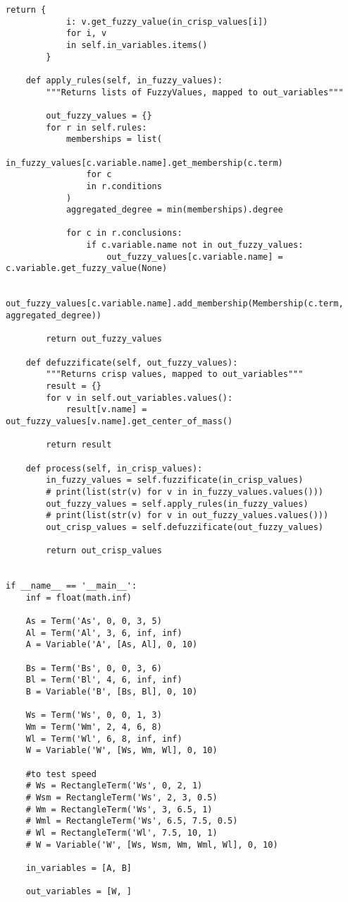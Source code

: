 \begin{lstlisting}[style=pythonstyle,caption={ }, label=lst:func:1]
		return {
			i: v.get_fuzzy_value(in_crisp_values[i])
			for i, v
			in self.in_variables.items()
		}

	def apply_rules(self, in_fuzzy_values):
		"""Returns lists of FuzzyValues, mapped to out_variables"""

		out_fuzzy_values = {}
		for r in self.rules:
			memberships = list(
				in_fuzzy_values[c.variable.name].get_membership(c.term)
				for c
				in r.conditions
			)
			aggregated_degree = min(memberships).degree

			for c in r.conclusions:
				if c.variable.name not in out_fuzzy_values:
					out_fuzzy_values[c.variable.name] = c.variable.get_fuzzy_value(None)

				out_fuzzy_values[c.variable.name].add_membership(Membership(c.term, aggregated_degree))

		return out_fuzzy_values

	def defuzzificate(self, out_fuzzy_values):
		"""Returns crisp values, mapped to out_variables"""
		result = {}
		for v in self.out_variables.values():
			result[v.name] = out_fuzzy_values[v.name].get_center_of_mass()

		return result

	def process(self, in_crisp_values):
		in_fuzzy_values = self.fuzzificate(in_crisp_values)
		# print(list(str(v) for v in in_fuzzy_values.values()))
		out_fuzzy_values = self.apply_rules(in_fuzzy_values)
		# print(list(str(v) for v in out_fuzzy_values.values()))
		out_crisp_values = self.defuzzificate(out_fuzzy_values)

		return out_crisp_values


if __name__ == '__main__':
	inf = float(math.inf)

	As = Term('As', 0, 0, 3, 5)
	Al = Term('Al', 3, 6, inf, inf)
	A = Variable('A', [As, Al], 0, 10)

	Bs = Term('Bs', 0, 0, 3, 6)
	Bl = Term('Bl', 4, 6, inf, inf)
	B = Variable('B', [Bs, Bl], 0, 10)

	Ws = Term('Ws', 0, 0, 1, 3)
	Wm = Term('Wm', 2, 4, 6, 8)
	Wl = Term('Wl', 6, 8, inf, inf)
	W = Variable('W', [Ws, Wm, Wl], 0, 10)

	#to test speed
	# Ws = RectangleTerm('Ws', 0, 2, 1)
	# Wsm = RectangleTerm('Ws', 2, 3, 0.5)
	# Wm = RectangleTerm('Ws', 3, 6.5, 1)
	# Wml = RectangleTerm('Ws', 6.5, 7.5, 0.5)
	# Wl = RectangleTerm('Wl', 7.5, 10, 1)
	# W = Variable('W', [Ws, Wsm, Wm, Wml, Wl], 0, 10)

	in_variables = [A, B]

	out_variables = [W, ]


\end{lstlisting}
